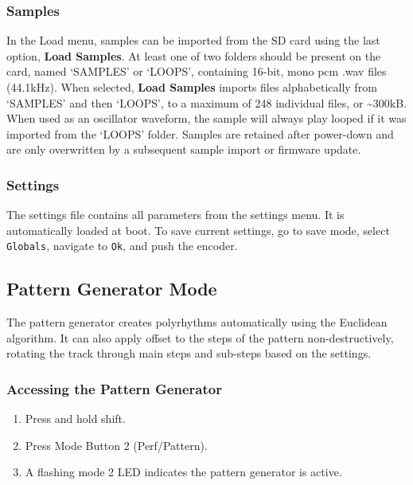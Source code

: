 \subsubsection{Samples}\label{samples}

In the Load menu, samples can be imported from the SD card using the
last option, \textbf{Load Samples}. At least one of two folders should
be present on the card, named `SAMPLES' or `LOOPS', containing 16-bit,
mono pcm .wav files (44.1kHz). When selected, \textbf{Load Samples}
imports files alphabetically from `SAMPLES' and then `LOOPS', to a
maximum of 248 individual files, or \textasciitilde300kB. When used as
an oscillator waveform, the sample will always play looped if it was
imported from the `LOOPS' folder. Samples are retained after power-down
and are only overwritten by a subsequent sample import or firmware
update.

\subsubsection{Settings}\label{settings}

The settings file contains all parameters from the settings menu. It is
automatically loaded at boot. To save current settings, go to save mode,
select \texttt{Globals}, navigate to \texttt{Ok}, and push the encoder.

\subsection{Pattern Generator Mode}\label{pattern-generator-mode}

The pattern generator creates polyrhythms automatically using the
Euclidean algorithm. It can also apply offset to the steps of the
pattern non-destructively, rotating the track through main steps and
sub-steps based on the settings.

\subsubsection{Accessing the Pattern
Generator}\label{accessing-the-pattern-generator}

\begin{enumerate}
\def\labelenumi{\arabic{enumi}.}
\tightlist
\item
  Press and hold shift.
\item
  Press Mode Button 2 (Perf/Pattern).
\item
  A flashing mode 2 LED indicates the pattern generator is active.
\end{enumerate}

